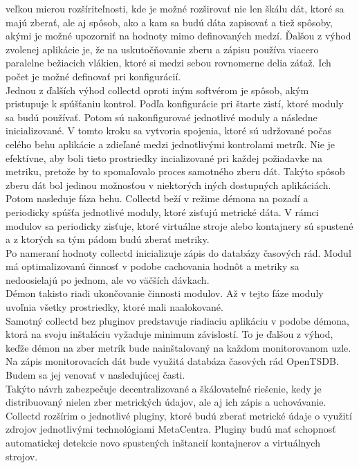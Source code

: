 \documentclass[printed,11pt,twoside,color,cover,table]{fithesis3}
\begin{document}
veľkou mierou rozšíriteľnosti, kde je možné rozširovať nie len škálu dát, ktoré sa majú zberať, ale aj spôsob, ako a kam sa budú dáta zapisovať a tiež spôsoby,
akými je možné upozorniť na hodnoty mimo definovaných medzí. Ďalšou z výhod zvolenej aplikácie je, že na uskutočňovanie zberu a zápisu používa viacero
paralelne bežiacich vlákien, ktoré si medzi sebou rovnomerne delia záťaž. Ich počet je možné definovať pri konfigurácií. 
\\Jednou z ďalších výhod collectd oproti iným softvérom je spôsob, akým pristupuje k spúšťaniu kontrol. Podľa konfigurácie pri štarte zistí, ktoré moduly sa budú používať. Potom sú nakonfigurovaé 
jednotlivé moduly a následne inicializované. V tomto kroku sa vytvoria spojenia, ktoré sú udržované počas celého behu aplikácie a zdieľané medzi jednotlivými kontrolami metrík. Nie je efektívne, aby boli 
tieto prostriedky incializované pri
každej požiadavke na metriku, pretože by to spomaľovalo proces samotného zberu dát. Takýto spôsob zberu dát bol jedinou možnosťou v niektorých iných dostupných aplikáciách.
\\Potom nasleduje fáza behu. Collectd beží v režime démona na pozadí a periodicky spúšťa jednotlivé moduly, ktoré zisťujú metrické dáta. 
V rámci modulov sa periodicky zisťuje, ktoré virtuálne stroje alebo kontajnery sú spustené a z ktorých sa tým pádom budú zberať metriky. 
\\Po nameraní hodnoty collectd inicializuje zápis do databázy časových rád. Modul má optimalizovanú činnosť v podobe cachovania
hodnôt a metriky sa nedoosielajú po jednom, ale vo väčších dávkach.
\\Démon takisto riadi ukončovanie činnosti modulov. Až v tejto fáze moduly uvoľnia všetky prostriedky, ktoré mali naalokované.
\\Samotný collectd bez pluginov predstavuje riadiaciu aplikáciu v podobe démona, ktorá na svoju inštaláciu vyžaduje minimum závislostí. To je ďalšou z výhod, keďže 
démon na zber metrík bude nainštalovaný na každom monitorovanom uzle.
\\Na zápis monitorovacích dát bude využitá databáza časových rád OpenTSDB. Budem sa jej venovať v nasledujúcej časti.
\\Takýto návrh zabezpečuje decentralizované a škálovateľné riešenie, kedy je distribuovaný nielen zber metrických údajov, ale aj ich zápis a uchovávanie.
\\Collectd rozšírim o jednotlivé pluginy, ktoré budú zberať metrické údaje o využití zdrojov jednotlivými technológiami MetaCentra. Pluginy budú 
mať schopnosť automatickej detekcie novo spustených inštancií kontajnerov a virtuálnych strojov.
\end{document}
